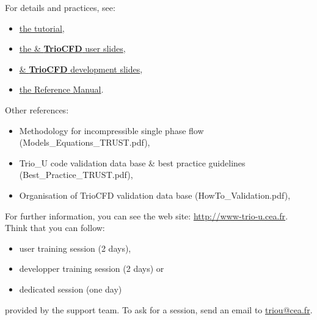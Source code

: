 For details and practices, see:
\begin{itemize}
\item \href{TRUST_tutorial.pdf}{the \trust tutorial},
\item \href{TRUST_and_TrioCFD_presentation.pdf}{the \trust \& \textbf{TrioCFD} user slides},
\item \href{Developer\_TRUST\_presentation.pdf}{\trust \& \textbf{TrioCFD} development slides},
\item \href{TRUST_Reference_Manual.pdf}{the \trust Reference Manual}.
\end{itemize}

Other references:
\begin{itemize}
\item Methodology for incompressible single phase flow (Models\_Equations\_TRUST.pdf),
\item Trio\_U code validation data base \& best practice guidelines (Best\_Practice\_TRUST.pdf),
\item Organisation of TrioCFD validation data base (HowTo\_Validation.pdf),
\end{itemize}

For further information, you can see the \trust web site: \href{http://www-trio-u.cea.fr}{http://www-trio-u.cea.fr}.\\

Think that you can follow:
\begin{itemize}
\item user training session (2 days),
\item developper training session (2 days) or 
\item dedicated session (one day)
\end{itemize}
provided by the support team.
To ask for a session, send an email to \href{mailto:triou@cea.fr}{triou@cea.fr}.

